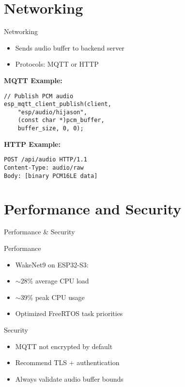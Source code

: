 \documentclass{beamer}
\begin{document}
\section{Networking}
\begin{frame}[fragile]{Networking}
  \begin{itemize}
    \item Sends audio buffer to backend server
    \item Protocols: MQTT or HTTP
  \end{itemize}

  \vspace{5mm}
  \textbf{MQTT Example:}
  \begin{lstlisting}
// Publish PCM audio
esp_mqtt_client_publish(client,
    "esp/audio/hijason",
    (const char *)pcm_buffer,
    buffer_size, 0, 0);
  \end{lstlisting}

  \textbf{HTTP Example:}
  \begin{lstlisting}
POST /api/audio HTTP/1.1
Content-Type: audio/raw
Body: [binary PCM16LE data]
  \end{lstlisting}
\end{frame}

\section{Performance and Security}
\begin{frame}{Performance \& Security}
  \begin{block}{Performance}
    \begin{itemize}
      \item WakeNet9 on ESP32-S3:
      \item $\sim$28\% average CPU load
      \item $\sim$39\% peak CPU usage
      \item Optimized FreeRTOS task priorities
    \end{itemize}
  \end{block}
  \begin{block}{Security}
    \begin{itemize}
      \item MQTT not encrypted by default
      \item Recommend TLS + authentication
      \item Always validate audio buffer bounds
    \end{itemize}
  \end{block}
\end{frame}
\end{document}
